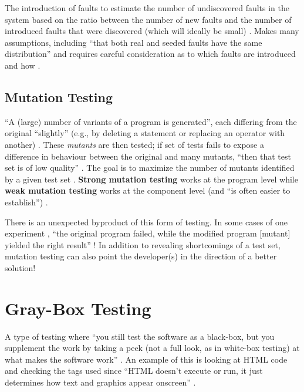 The introduction of faults to estimate the number of undiscovered faults in the
system based on the ratio between the number of new faults and the number of
introduced faults that were discovered (which will ideally be small)
\citep[p.~427]{vanVliet2000}. Makes many assumptions, including
``that both real and seeded faults have the same distribution'' and requires
careful consideration as to which faults are introduced and how
\citep[p.~427]{vanVliet2000}.

\subsection[Mutation Testing]{Mutation Testing \citep[pp.~428-429]{vanVliet2000}}
\label{chap:testing:sec:mutation-testing}

``A (large) number of variants of a program is generated'', each differing from
the original ``slightly'' (e.g., by deleting a statement or replacing an
operator with another) \citep[p.~428]{vanVliet2000}. These
\emph{mutants} are then tested; if set of tests fails to expose a difference in
behaviour between the original and many mutants, ``then that test set is of low
quality'' \citep[pp.~428-429]{vanVliet2000}. The goal is to maximize
the number of mutants identified by a given test set
\citep[p.~429]{vanVliet2000}. \textbf{Strong mutation testing} works
at the program level while \textbf{weak mutation testing} works at the
component level (and ``is often easier to establish'')
\citep[p.~429]{vanVliet2000}.

There is an unexpected byproduct of this form of testing. In some cases of one
experiment , ``the original program failed,
while the modified program [mutant] yielded the right result''
\citep[p.~432]{vanVliet2000}! In addition to revealing shortcomings
of a test set, mutation testing can also point the developer(s) in the
direction of a better solution!

\section[Gray-Box Testing]{Gray-Box Testing \citep[pp.~218-220]{Patton2006}}
A type of testing where ``you still test the software as a black-box, but you
supplement the work by taking a peek (not a full look, as in white-box testing)
at what makes the software work'' \citep[p.~218]{Patton2006}. An
example of this is looking at HTML code and checking the tags used since
``HTML doesn't execute or run, it just determines how text and graphics appear
onscreen'' \citep[p.~220]{Patton2006}.

